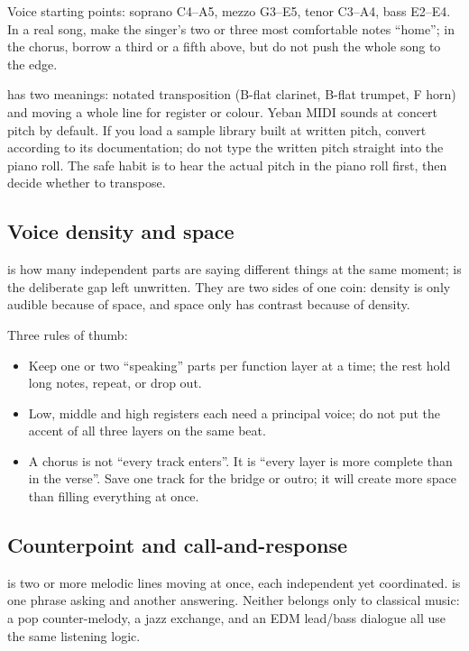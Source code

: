 Voice starting points: soprano C4--A5, mezzo G3--E5, tenor C3--A4, bass E2--E4. In a real song, make the singer's two or three most comfortable notes ``home''; in the chorus, borrow a third or a fifth above, but do not push the whole song to the edge.

 has two meanings: notated transposition (B-flat clarinet, B-flat trumpet, F horn) and moving a whole line for register or colour. Yeban MIDI sounds at concert pitch by default. If you load a sample library built at written pitch, convert according to its documentation; do not type the written pitch straight into the piano roll. The safe habit is to hear the actual pitch in the piano roll first, then decide whether to transpose.

\subsection{Voice density and space}
\label{sec:density-space}

 is how many independent parts are saying different things at the same moment;  is the deliberate gap left unwritten. They are two sides of one coin: density is only audible because of space, and space only has contrast because of density.

Three rules of thumb:

\begin{itemize}
\item Keep one or two ``speaking'' parts per function layer at a time; the rest hold long notes, repeat, or drop out.
\item Low, middle and high registers each need a principal voice; do not put the accent of all three layers on the same beat.
\item A chorus is not ``every track enters''. It is ``every layer is more complete than in the verse''. Save one track for the bridge or outro; it will create more space than filling everything at once.
\end{itemize}

\subsection{Counterpoint and call-and-response}
\label{sec:counterpoint-call}

 is two or more melodic lines moving at once, each independent yet coordinated.  is one phrase asking and another answering. Neither belongs only to classical music: a pop counter-melody, a jazz exchange, and an EDM lead/bass dialogue all use the same listening logic.

